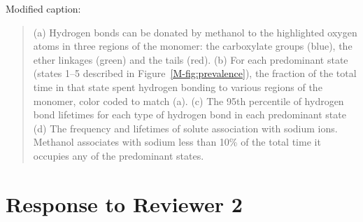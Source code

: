 \documentclass{article}
\begin{document}
\begin{enumerate}[label={Comment \theenumi :}, leftmargin=3.9\parindent]
    Modified caption:
    \begin{quote}
    (a) Hydrogen bonds can be donated by methanol to the highlighted oxygen atoms in three 
    regions of the monomer: the carboxylate groups (blue), the ether linkages (green) and the
    tails (red). (b) For each predominant state (states 1--5 described in Figure~\ref{M-fig:prevalence}),
    the fraction of the total time in that state spent hydrogen bonding to various regions
    of the monomer, color coded to match (a). (c) The 95th percentile of hydrogen bond lifetimes for
    each type of hydrogen bond in each predominant state (d) The frequency and lifetimes of solute 
    association with sodium ions. Methanol associates with sodium less than 10\% of the total time 
    it occupies any of the predominant states.    
    \end{quote}

\end{enumerate}


\section*{Response to Reviewer 2}
\end{document}
